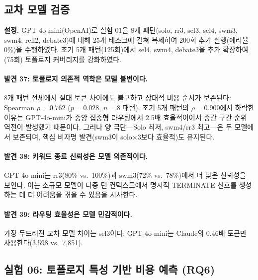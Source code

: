\documentclass[a4paper,11pt]{article}
\begin{document}
\subsection{교차 모델 검증}
\label{sec:cross-model}

\textbf{설정.} GPT-4o-mini(OpenAI)로 실험 01을 8개 패턴(solo, rr3, sel3, sel4, swm3, swm4, refl2, debate3)에 대해 25개 태스크에 걸쳐 복제하여 200회 추가 실행(에러율 0\%)을 수행하였다. 초기 5개 패턴(125회)에서 sel4, swm4, debate3을 추가 확장하여(75회) 토폴로지 커버리지를 강화하였다.



\paragraph{발견 37: 토폴로지 의존적 역학은 모델 불변이다.}
8개 패턴 전체에서 절대 토큰 차이에도 불구하고 상대적 비용 순서가 보존된다: Spearman $\rho = 0.762$ ($p = 0.028$, $n = 8$ 패턴). 초기 5개 패턴의 $\rho = 0.900$에서 하락한 이유는 GPT-4o-mini가 중앙 집중형 라우팅에서 2.5배 효율적이어서 중간 구간 순위 역전이 발생했기 때문이다. 그러나 양 극단---Solo 최저, swm4/rr3 최고---은 두 모델에서 보존되며, 핵심 비자명 발견(swm3이 solo$\times$3보다 효율적)도 유지된다.

\paragraph{발견 38: 키워드 종료 신뢰성은 모델 의존적이다.}
GPT-4o-mini는 rr3(80\% vs.\ 100\%)과 swm3(72\% vs.\ 78\%)에서 더 낮은 신뢰성을 보인다. 이는 소규모 모델이 다중 턴 컨텍스트에서 명시적 TERMINATE 신호를 생성하는 데 더 어려움을 겪을 수 있음을 시사한다.

\paragraph{발견 39: 라우팅 효율성은 모델 민감적이다.}
가장 두드러진 교차 모델 차이는 sel3이다: GPT-4o-mini는 Claude의 0.46배 토큰만 사용한다(3,598 vs.\ 7,851).

\subsection{실험 06: 토폴로지 특성 기반 비용 예측 (RQ6)}
\label{sec:exp06}
\end{document}

